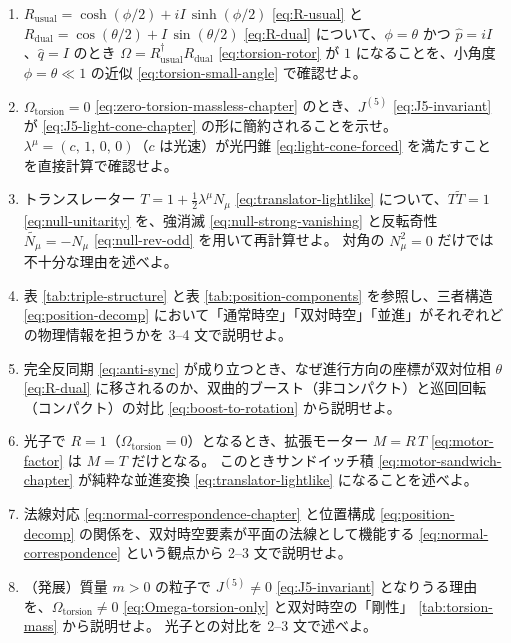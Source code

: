 \documentclass[dvipdfmx,a4paper,oneside]{jsbook}
\numberwithin{equation}{chapter}
\begin{document}
\begin{enumerate}[leftmargin=2em]
  \item \(R_{\mathrm{usual}} = \cosh(\phi/2) + iI\,\sinh(\phi/2)\) \eqref{eq:R-usual} と \(R_{\mathrm{dual}} = \cos(\theta/2) + I\,\sin(\theta/2)\) \eqref{eq:R-dual} について、\(\phi = \theta\) かつ \(\hat{p} = iI\)、\(\hat{q} = I\) のとき \(\Omega = R_{\mathrm{usual}}^\dagger R_{\mathrm{dual}}\) \eqref{eq:torsion-rotor} が \(1\) になることを、小角度 \(\phi = \theta \ll 1\) の近似 \eqref{eq:torsion-small-angle} で確認せよ。

  \item \(\Omega_{\mathrm{torsion}} = 0\) \eqref{eq:zero-torsion-massless-chapter} のとき、\(J^{(5)}\) \eqref{eq:J5-invariant} が \eqref{eq:J5-light-cone-chapter} の形に簡約されることを示せ。
  \(\lambda^\mu = (c,\, 1,\, 0,\, 0)\)（\(c\) は光速）が光円錐 \eqref{eq:light-cone-forced} を満たすことを直接計算で確認せよ。

  \item トランスレーター \(T = 1 + \tfrac{1}{2}\lambda^\mu N_\mu\) \eqref{eq:translator-lightlike} について、\(T\widetilde{T} = 1\) \eqref{eq:null-unitarity} を、強消滅 \eqref{eq:null-strong-vanishing} と反転奇性 \(\widetilde{N_\mu} = -N_\mu\) \eqref{eq:null-rev-odd} を用いて再計算せよ。
  対角の \(N_\mu^2 = 0\) だけでは不十分な理由を述べよ。

  \item 表 \ref{tab:triple-structure} と表 \ref{tab:position-components} を参照し、三者構造 \eqref{eq:position-decomp} において「通常時空」「双対時空」「並進」がそれぞれどの物理情報を担うかを 3--4 文で説明せよ。

  \item 完全反同期 \eqref{eq:anti-sync} が成り立つとき、なぜ進行方向の座標が双対位相 \(\theta\) \eqref{eq:R-dual} に移されるのか、双曲的ブースト（非コンパクト）と巡回回転（コンパクト）の対比 \eqref{eq:boost-to-rotation} から説明せよ。

  \item 光子で \(R = 1\)（\(\Omega_{\mathrm{torsion}} = 0\)）となるとき、拡張モーター \(M = R\,T\) \eqref{eq:motor-factor} は \(M = T\) だけとなる。
  このときサンドイッチ積 \eqref{eq:motor-sandwich-chapter} が純粋な並進変換 \eqref{eq:translator-lightlike} になることを述べよ。

  \item 法線対応 \eqref{eq:normal-correspondence-chapter} と位置構成 \eqref{eq:position-decomp} の関係を、双対時空要素が平面の法線として機能する \eqref{eq:normal-correspondence} という観点から 2--3 文で説明せよ。

  \item （発展）質量 \(m > 0\) の粒子で \(J^{(5)} \neq 0\) \eqref{eq:J5-invariant} となりうる理由を、\(\Omega_{\mathrm{torsion}} \neq 0\) \eqref{eq:Omega-torsion-only} と双対時空の「剛性」 \eqref{tab:torsion-mass} から説明せよ。
  光子との対比を 2--3 文で述べよ。
\end{enumerate}
\end{document}
